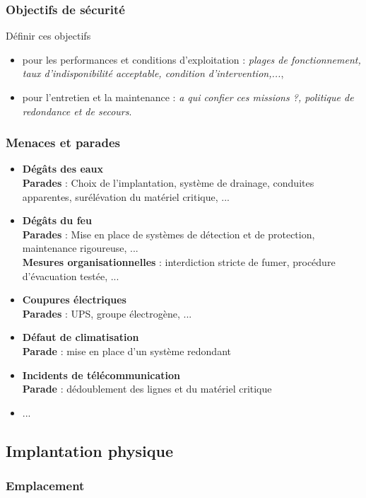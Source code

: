 \documentclass[10pt,a4paper,oneside,titlepage]{report}
\newcommand{\titre}[1]{\textcolor{title}{#1}}
\newcommand{\strong}[1]{\textbf{\titre{#1}}}
\begin{document}
\begin{sffamily}
\subsubsection{Objectifs de sécurité}

Définir ces objectifs
\begin{itemize}
\item pour les performances et conditions d'exploitation : \textit{plages de fonctionnement, taux d'indisponibilité acceptable, condition d'intervention,...},
\item pour l'entretien et la maintenance : \textit{a qui confier ces missions ?, politique de redondance et de secours}.
\end{itemize}

\subsubsection{Menaces et parades}

\begin{itemize}
\item \strong{Dégâts des eaux}\\
\textbf{Parades} : Choix de l'implantation, système de drainage, conduites apparentes, surélévation du matériel critique, ...
\item \strong{Dégâts du feu}\\
\textbf{Parades} : Mise en place de systèmes de détection et de protection, maintenance rigoureuse, ...\\
\textbf{Mesures organisationnelles} : interdiction stricte de fumer, procédure d'évacuation testée, ...
\item \strong{Coupures électriques}\\
\textbf{Parades} : UPS, groupe électrogène, ...
\item \strong{Défaut de climatisation}\\
\textbf{Parade} : mise en place d'un système redondant
\item \strong{Incidents de télécommunication}\\
\textbf{Parade} : dédoublement des lignes et du matériel critique
\item ...
\end{itemize}

\subsection{Implantation physique}

\subsubsection{Emplacement}


\end{sffamily}
\end{document}
